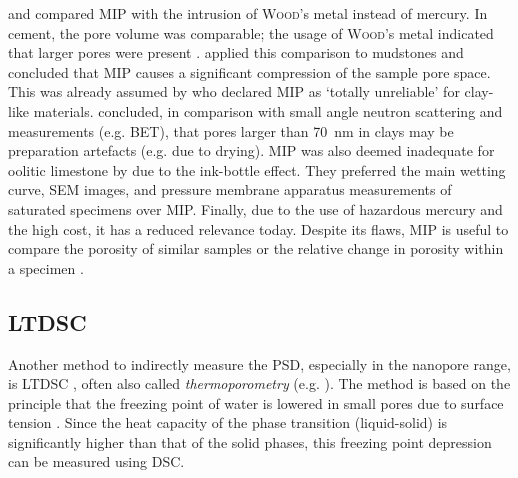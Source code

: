 \textcite{abell.1999} and \textcite{hildenbrand.2003} compared \ac{MIP} with the intrusion of \textsc{Wood}'s metal instead of mercury.
In cement, the pore volume was comparable; the usage of \textsc{Wood}'s metal indicated that larger pores were present \cite{abell.1999}.
\textcite{hildenbrand.2003} applied this comparison to mudstones and concluded that \ac{MIP} causes a significant compression of the sample pore space.
This was already assumed by \cite{horseman.1996} who declared \ac{MIP} as `totally unreliable' for clay-like materials.
\textcite{hall.1986} concluded, in comparison with small angle neutron scattering and  measurements (e.g. \ac{BET}), that pores larger than \qty{70}{\nano\meter} in clays may be preparation artefacts (e.g. due to drying).
\ac{MIP} was also deemed inadequate for oolitic limestone by \textcite{roels.2001} due to the ink-bottle effect.
They preferred the main wetting curve, \ac{SEM} images, and pressure membrane apparatus measurements of saturated specimens over \ac{MIP}.
Finally, due to the use of hazardous mercury and the high cost, it has a reduced relevance today.
Despite its flaws, \ac{MIP} is useful to compare the porosity of similar samples or the relative change in porosity within a specimen \cite{juntgen.1966}.






\FloatBarrier
\subsection{\Acl*{LTDSC}}

Another method to indirectly measure the \ac{PSD}, especially in the nanopore range, is \ac{LTDSC} \cite{brun.1973,brun.1977}, often also called \textit{thermoporometry} (e.g. \cite{joseph.2024}).
The method is based on the principle that the freezing point of water is lowered in small pores due to surface tension \cite{brun.1973,brun.1977}.
Since the heat capacity of the phase transition (liquid-solid) is significantly higher than that of the solid phases, this freezing point depression can be measured using \ac{DSC}.


